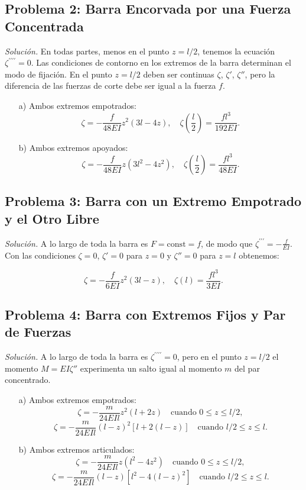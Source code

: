 \documentclass{article}
\begin{document}
\subsection*{Problema 2: Barra Encorvada por una Fuerza Concentrada}

\textit{Solución.} En todas partes, menos en el punto $z = l/2$, tenemos la ecuación $\zeta^{\prime\prime\prime\prime} = 0$. Las condiciones de contorno en los extremos de la barra determinan el modo de fijación. En el punto $z = l/2$ deben ser continuas $\zeta$, $\zeta'$, $\zeta''$, pero la diferencia de las fuerzas de corte debe ser igual a la fuerza $f$.

\begin{enumerate}
    \item[a)] Ambos extremos empotrados:
    $$
    \zeta = -\frac{f}{48EI} z^2(3l - 4z), \quad \zeta\left(\frac{l}{2}\right) = \frac{fl^3}{192EI}.
    $$

    \item[b)] Ambos extremos apoyados:
    $$
    \zeta = -\frac{f}{48EI} z(3l^2 - 4z^2), \quad \zeta\left(\frac{l}{2}\right) = \frac{fl^3}{48EI}.
    $$
\end{enumerate}

\subsection*{Problema 3: Barra con un Extremo Empotrado y el Otro Libre}

\textit{Solución.} A lo largo de toda la barra es $F = \text{const} = f$, de modo que $\zeta^{\prime\prime\prime} = -\frac{f}{EI}$. Con las condiciones $\zeta = 0$, $\zeta' = 0$ para $z = 0$ y $\zeta'' = 0$ para $z = l$ obtenemos:

$$
\zeta = -\frac{f}{6EI} z^2(3l - z), \quad \zeta(l) = \frac{fl^3}{3EI}.
$$

\subsection*{Problema 4: Barra con Extremos Fijos y Par de Fuerzas}

\textit{Solución.} A lo largo de toda la barra es $\zeta^{\prime\prime\prime\prime} = 0$, pero en el punto $z = l/2$ el momento $M = EI\zeta''$ experimenta un salto igual al momento $m$ del par concentrado.

\begin{enumerate}
    \item[a)] Ambos extremos empotrados:
    $$
    \zeta = -\frac{m}{24EIl} z^2(l + 2z) \quad \text{cuando } 0 \leq z \leq l/2,
    $$
    $$
    \zeta = -\frac{m}{24EIl} (l - z)^2[l + 2(l - z)] \quad \text{cuando } l/2 \leq z \leq l.
    $$

    \item[b)] Ambos extremos articulados:
    $$
    \zeta = -\frac{m}{24EIl} z(l^2 - 4z^2) \quad \text{cuando } 0 \leq z \leq l/2,
    $$
    $$
    \zeta = -\frac{m}{24EIl} (l - z)[l^2 - 4(l - z)^2] \quad \text{cuando } l/2 \leq z \leq l.
    $$
\end{enumerate}
\end{document}
